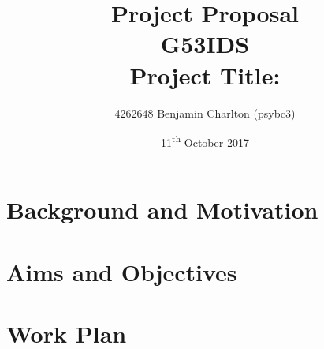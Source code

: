 \documentclass{article}
\title{
    Project Proposal
    \\ \large{G53IDS}
    \\ \large{Project Title: }\vspace{-3ex}}
\author{4262648 Benjamin Charlton (psybc3)}
\date{\vspace{-2ex}11\textsuperscript{th} October 2017}
\begin{document}
\maketitle

\section{Background and Motivation}
\lipsum[1]

\section{Aims and Objectives}
\lipsum[1]

\section{Work Plan}
\lipsum[1]
\end{document}
